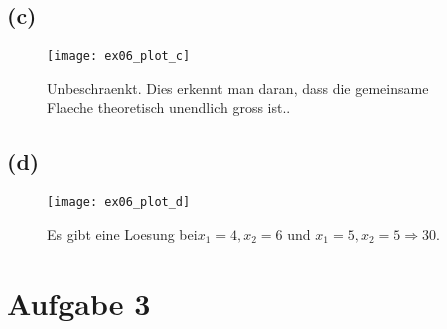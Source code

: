 \documentclass[a4paper]{scrartcl}
\begin{document}
\subsection*{(c)}
\begin{figure}[H]
	\texttt{[image: ex06\_plot\_c]}
	\caption{Unbeschraenkt. Dies erkennt man daran, dass die gemeinsame Flaeche theoretisch unendlich gross ist..}
\end{figure}



\subsection*{(d)}
\begin{figure}[H]
	\texttt{[image: ex06\_plot\_d]}
	\caption{Es gibt eine Loesung bei$x_1 = 4, x_2 = 6$ und $x_1 = 5, x_2 = 5 \Rightarrow 30$.}
\end{figure}








\section*{Aufgabe 3}
\end{document}

